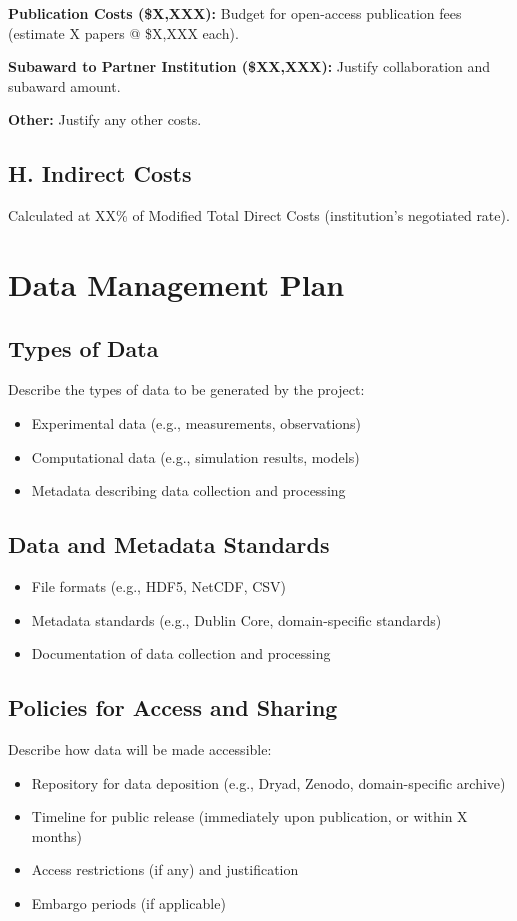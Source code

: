 \documentclass[11pt,letterpaper]{article}
\begin{document}
\textbf{Publication Costs (\$X,XXX):} Budget for open-access publication fees (estimate X papers @ \$X,XXX each).

\textbf{Subaward to Partner Institution (\$XX,XXX):} Justify collaboration and subaward amount.

\textbf{Other:} Justify any other costs.

\subsection*{H. Indirect Costs}
Calculated at XX\% of Modified Total Direct Costs (institution's negotiated rate).

\newpage


\section*{Data Management Plan}

\subsection*{Types of Data}
Describe the types of data to be generated by the project:
\begin{itemize}
    \item Experimental data (e.g., measurements, observations)
    \item Computational data (e.g., simulation results, models)
    \item Metadata describing data collection and processing
\end{itemize}

\subsection*{Data and Metadata Standards}
\begin{itemize}
    \item File formats (e.g., HDF5, NetCDF, CSV)
    \item Metadata standards (e.g., Dublin Core, domain-specific standards)
    \item Documentation of data collection and processing
\end{itemize}

\subsection*{Policies for Access and Sharing}
Describe how data will be made accessible:
\begin{itemize}
    \item Repository for data deposition (e.g., Dryad, Zenodo, domain-specific archive)
    \item Timeline for public release (immediately upon publication, or within X months)
    \item Access restrictions (if any) and justification
    \item Embargo periods (if applicable)
\end{itemize}
\end{document}

